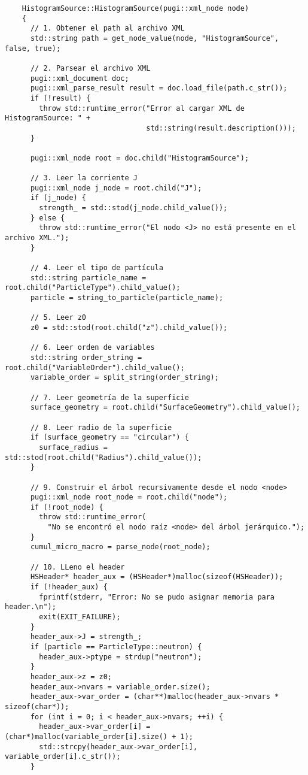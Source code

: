 \begin{verbatim}
    HistogramSource::HistogramSource(pugi::xml_node node)
    {
      // 1. Obtener el path al archivo XML
      std::string path = get_node_value(node, "HistogramSource", false, true);
    
      // 2. Parsear el archivo XML
      pugi::xml_document doc;
      pugi::xml_parse_result result = doc.load_file(path.c_str());
      if (!result) {
        throw std::runtime_error("Error al cargar XML de HistogramSource: " +
                                 std::string(result.description()));
      }
    
      pugi::xml_node root = doc.child("HistogramSource");
    
      // 3. Leer la corriente J
      pugi::xml_node j_node = root.child("J");
      if (j_node) {
        strength_ = std::stod(j_node.child_value());
      } else {
        throw std::runtime_error("El nodo <J> no está presente en el archivo XML.");
      }
    
      // 4. Leer el tipo de partícula
      std::string particle_name = root.child("ParticleType").child_value();
      particle = string_to_particle(particle_name);
    
      // 5. Leer z0
      z0 = std::stod(root.child("z").child_value());
    
      // 6. Leer orden de variables
      std::string order_string = root.child("VariableOrder").child_value();
      variable_order = split_string(order_string);
    
      // 7. Leer geometría de la superficie
      surface_geometry = root.child("SurfaceGeometry").child_value();
    
      // 8. Leer radio de la superficie
      if (surface_geometry == "circular") {
        surface_radius = std::stod(root.child("Radius").child_value());
      }
    
      // 9. Construir el árbol recursivamente desde el nodo <node>
      pugi::xml_node root_node = root.child("node");
      if (!root_node) {
        throw std::runtime_error(
          "No se encontró el nodo raíz <node> del árbol jerárquico.");
      }
      cumul_micro_macro = parse_node(root_node);
    
      // 10. LLeno el header
      HSHeader* header_aux = (HSHeader*)malloc(sizeof(HSHeader));
      if (!header_aux) {
        fprintf(stderr, "Error: No se pudo asignar memoria para header.\n");
        exit(EXIT_FAILURE);
      }
      header_aux->J = strength_;
      if (particle == ParticleType::neutron) {
        header_aux->ptype = strdup("neutron");
      }
      header_aux->z = z0;
      header_aux->nvars = variable_order.size();
      header_aux->var_order = (char**)malloc(header_aux->nvars * sizeof(char*));
      for (int i = 0; i < header_aux->nvars; ++i) {
        header_aux->var_order[i] = (char*)malloc(variable_order[i].size() + 1);
        std::strcpy(header_aux->var_order[i], variable_order[i].c_str());
      }
    

\end{verbatim}
